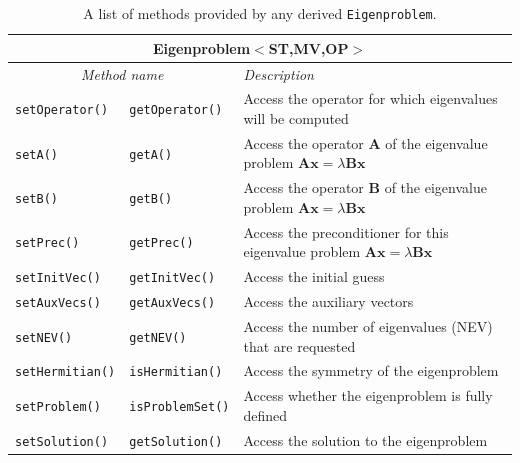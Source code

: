 \documentclass[acmtoms,acmnow]{acmtrans2m}
\newcommand{\aspace}[1]{\texttt{#1}}
\begin{document}
\begin{table}[htb]
\begin{center}
  \caption{A list of methods provided by any derived \aspace{Eigenproblem}.} 
\label{tab:anasazi:eigenproblem}
\begin{tabular}{| p{2cm}  p{2cm} | p{6cm} |}
\hline
\multicolumn{3}{|c|}{\textbf{Eigenproblem$<$ST,MV,OP$>$}} \\\hline
\multicolumn{2}{|c|}{\emph{Method name}} & \emph{Description} \\
\hline
{\tt setOperator()}&{\tt getOperator()}    & Access the operator for which eigenvalues will be computed \\
{\tt setA()}&{\tt getA()}                  & Access the operator $\mathbf{A}$ of the eigenvalue problem $\mathbf{Ax}=\lambda \mathbf{Bx}$  \\
{\tt setB()}&{\tt getB()}                  & Access the operator $\mathbf{B}$ of the eigenvalue problem $\mathbf{Ax}=\lambda \mathbf{Bx}$  \\
{\tt setPrec()}&{\tt getPrec()}            & Access the preconditioner for this eigenvalue problem $\mathbf{Ax}=\lambda \mathbf{Bx}$  \\
{\tt setInitVec()}&{\tt getInitVec()}      & Access the initial guess \\
{\tt setAuxVecs()}&{\tt getAuxVecs()}      & Access the auxiliary vectors \\
{\tt setNEV()}&{\tt getNEV()}              & Access the number of eigenvalues (NEV) that are requested  \\
{\tt setHermitian()}&{\tt isHermitian()}   & Access the symmetry of the eigenproblem \\
{\tt setProblem()}&{\tt isProblemSet()}    & Access whether the eigenproblem is fully defined  \\
{\tt setSolution()}&{\tt getSolution()}    & Access the solution to the eigenproblem \\
\hline
\end{tabular}
\end{center}
\end{table}
\end{document}

